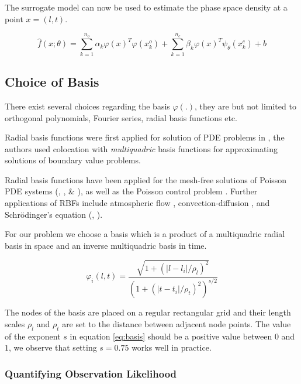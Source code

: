 \documentclass{article}
\begin{document}
The surrogate model can now be used to estimate the phase space density 
at a point $x = (l,t)$.

\begin{equation}\label{eq:model}
\hat{f}(x;\theta) = \sum_{k = 1}^{n_{o}}{\alpha_{k}\varphi(x)^{T}\varphi(x^{o}_{k}) + \sum_{k = 1}^{n_{c}}}{\beta_{k} \varphi(x)^{T} \psi_{\theta}(x^{c}_{k})} + b
\end{equation}

\subsection*{Choice of Basis}

There exist several choices regarding the basis $\varphi(.)$, they are but not limited to 
orthogonal polynomials, Fourier series, radial basis functions etc. 

Radial basis functions were first applied for solution of PDE problems in \cite{KANSA1990147}, 
the authors used colocation with \emph{multiquadric} basis functions for approximating solutions
of boundary value problems.

Radial basis functions have been applied for the mesh-free solutions of Poisson PDE systems 
(\citep{AMINATAEI20082887}, \citep{DUAN200866}, \citep{DUAN2006394} \& \citep{CNM:CNM419}),
as well as the Poisson control problem \citet{Pearson2013}. Further applications of RBFs include 
atmospheric flow \citep{Tillenius2015406}, convection-diffusion \citep{Safdari-Vaighani2015}, and 
Schrödinger's equation (\citep{doi:10.1137/120893975}, \citep{doi:10.1063/1.3637863}). 

For our problem we choose a basis which is a product of a multiquadric radial basis in space and 
an inverse multiquadric basis in time.

\begin{equation}\label{eq:basis}
\varphi_{i}(l,t) = \frac{\sqrt{1+(|l - l_{i}|/\rho_{l})^{2}}}{(1+(|t - t_{i}|/\rho_{t})^{2})^{s/2}}
\end{equation}

The nodes of the basis are placed on a regular rectangular grid and their 
length scales $\rho_l$ and $\rho_t$ are set to the distance between adjacent
node points. The value of the exponent $s$ in equation \ref{eq:basis} should be
a positive value between $0$ and $1$, we observe that setting $s = 0.75$ works well
in practice.

\subsubsection*{Quantifying Observation Likelihood}
\end{document}
